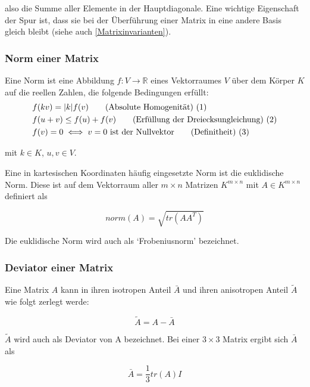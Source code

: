 \documentclass[a4paper,fontsize=12pt,toc=bib,halfparskip]{scrartcl}
\begin{document}
also die Summe aller Elemente in der Hauptdiagonale. Eine wichtige Eigenschaft der Spur ist, dass sie bei der \"Uberf\"uhrung einer Matrix in eine andere Basis gleich bleibt (siehe auch \ref{Matrixinvarianten}).


\subsubsection{Norm einer Matrix}
Eine Norm ist eine Abbildung $f: V \rightarrow \mathbb{R}$ eines Vektorraumes $V$ \"uber dem K\"orper $K$ auf die reellen Zahlen, die folgende Bedingungen erf\"ullt:
\begin{align}
	&f(kv) = |k|f(v) \tag{Absolute Homogenit\"at) (\addtocounter{equation}{1}\theequation}\\
	&f(u+v) \leq f(u) + f(v) \tag{Erf\"ullung der Dreiecksungleichung) (\addtocounter{equation}{1}\theequation}\\
	&f(v) = 0 \iff v=0 \text{ ist der Nullvektor} \tag{Definitheit) (\addtocounter{equation}{1}\theequation}
\end{align}

mit $k \in K$, $u,v \in V$.


Eine in kartesischen Koordinaten h\"aufig eingesetzte Norm ist die euklidische Norm. Diese ist auf dem Vektorraum aller $m \times n$ Matrizen $K^{m\times n}$ mit $A \in K^{m\times n}$ definiert als

\begin{equation}
	norm(A) = \sqrt{tr(AA^T)}
\end{equation}

Die euklidische Norm wird auch als `Frobeniusnorm' bezeichnet.

\subsubsection{Deviator einer Matrix}
Eine Matrix $A$ kann in ihren isotropen Anteil $\bar{A}$ und ihren anisotropen Anteil $\tilde{A}$ wie folgt zerlegt werde:

\begin{equation}
\tilde{A} = A - \bar{A}
\end{equation}

$\tilde{A}$ wird auch als Deviator von A bezeichnet. Bei einer $3\times 3$ Matrix ergibt sich $\bar{A}$ als

\begin{equation}
\bar{A} = \frac{1}{3}tr(A)I
\end{equation}
\end{document}

